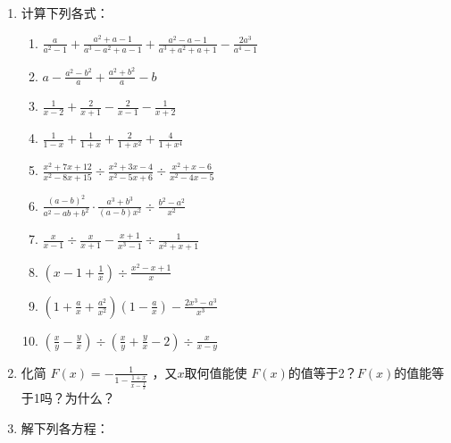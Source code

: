 \begin{enumerate}
\item 计算下列各式：
\begin{enumerate}
\item $\frac{a}{a^{2}-1}+\frac{a^{2}+ a-1}{a^{3}-a^{2}+a-1}+\frac{a^{2}-a-1}{a^{3}+a^{2}+a+1}-\frac{2 a^{3}}{a^{4}-1}$
\item  $a-\frac{a^{2}-b^{2}}{a}+\frac{a^{2}+b^{2}}{a}-b$
\item $\frac{1}{x-2}+\frac{2}{x+1}-\frac{2}{x-1}-\frac{1}{x+2}$
\item $\frac{1}{1-x}+\frac{1}{1+x}+\frac{2}{1+x^{2}}+\frac{4}{1+x^{4}}$
\item $\frac{x^{2}+7 x+12}{x^{2}-8 x+15} \div \frac{x^{2}+3 x-4}{x^{2}-5 x+6} \div \frac{x^{2}+x-6}{x^{2}-4 x-5}$
\item $\frac{(a-b)^{2}}{a^{2}-a b+b^{2}} \cdot \frac{a^{3}+b^{3}}{(a-b) x^{2}} \div \frac{b^{2}-a^{2}}{x^{2}}$
\item  $\frac{x}{x-1}\div\frac{x}{x+1}-\frac{x+1}{x^{3}-1} \div \frac{1}{x^{2}+x+1}$
\item $\left(x-1+\frac{1}{x}\right)\div \frac{x^{2}-x+1}{x}$
\item $\left(1+\frac{a}{x}+\frac{a^2}{x^2}\right)\left(1-\frac{a}{x}\right)-\frac{2x^3-a^3}{x^3}$
\item $\left(\frac{x}{y}-\frac{y}{x}\right)\div \left(\frac{x}{y}+\frac{y}{x}-2\right)\div \frac{x}{x-y}$
\end{enumerate}

\item 化简 $F(x)=-\frac{1}{1-\frac{1+x}{x-\frac{1}{x}}}$
，又$x$取何值能使 $F(x)$的值等于2？$F(x)$的值能等于1吗？为什么？
\item 解下列各方程：
\begin{enumerate}
\end{enumerate}


\end{enumerate}
